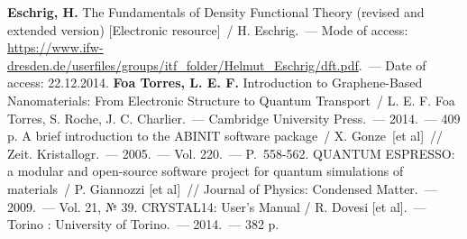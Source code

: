 \def\bibname{СПИСОК ИСПОЛЬЗОВАННЫХ ИСТОЧНИКОВ}
\begin{thebibliography}{99}
 \textbf{Eschrig, H.} The Fundamentals of Density Functional Theory (revised and extended version) [Electronic resource]~/ H. Eschrig.~--- Mode of access: \url{https://www.ifw-dresden.de/userfiles/groups/itf\_folder/Helmut_Eschrig/dft.pdf}.~--- Date of access: 22.12.2014.
 \textbf{Foa Torres, L. E. F.} Introduction to Graphene-Based Nanomaterials: From Electronic Structure to Quantum Transport~/ L. E. F. Foa Torres, S. Roche, J. C. Charlier.~---
    Cambridge University Press.~--- 2014.~--- 409 p.
 A brief introduction to the ABINIT software package~/ X. Gonze~[et al]~// Zeit. Kristallogr.~--- 2005.~--- Vol. 220.~--- P.~558-562.
 QUANTUM ESPRESSO: a modular and open-source software project for quantum simulations of materials~/ P. Giannozzi [et al]~// Journal of Physics: Condensed Matter.~--- 2009.~--- Vol. 21, № 39.
 CRYSTAL14: User’s Manual / R. Dovesi [et al].~--- Torino : University of Torino.~--- 2014.~--- 382 p.
\end{thebibliography}
